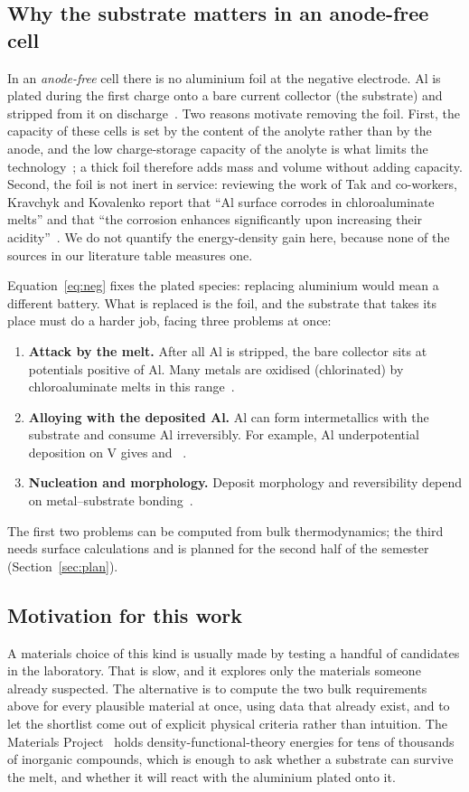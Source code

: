 \documentclass{report}
\begin{document}
\subsection{Why the substrate matters in an anode-free cell}
In an \emph{anode-free} cell there is no aluminium foil at the negative electrode. Al is plated during the first charge onto a bare current collector (the substrate) and stripped from it on discharge~\citep{WangL2021}. Two reasons motivate removing the foil. First, the capacity of these cells is set by the  content of the anolyte rather than by the anode, and the low charge-storage capacity of the anolyte is what limits the technology~\citep{Kravchyk2020}; a thick foil therefore adds mass and volume without adding capacity. Second, the foil is not inert in service: reviewing the work of Tak and co-workers, Kravchyk and Kovalenko report that ``Al surface corrodes in chloroaluminate melts'' and that ``the corrosion enhances significantly upon increasing their acidity''~\citep{Kravchyk2020b}. We do not quantify the energy-density gain here, because none of the sources in our literature table measures one.

Equation~\eqref{eq:neg} fixes the plated species: replacing aluminium would mean a different battery. What is replaced is the foil, and the substrate that takes its place must do a harder job, facing three problems at once:
\begin{enumerate}[leftmargin=*]
\item \textbf{Attack by the melt.} After all Al is stripped, the bare collector sits at potentials positive of Al. Many metals are oxidised (chlorinated) by chloroaluminate melts in this range~\citep{Wang2018,Oh2018,Reed2013}.
\item \textbf{Alloying with the deposited Al.} Al can form intermetallics with the substrate and consume Al irreversibly. For example, Al underpotential deposition on V gives  and ~\citep{Cvetkovic2021}.
\item \textbf{Nucleation and morphology.} Deposit morphology and reversibility depend on metal--substrate bonding~\citep{Zheng2021}.
\end{enumerate}
The first two problems can be computed from bulk thermodynamics; the third needs surface calculations and is planned for the second half of the semester (Section~\ref{sec:plan}).

\subsection{Motivation for this work}
A materials choice of this kind is usually made by testing a handful of candidates in the laboratory. That is slow, and it explores only the materials someone already suspected. The alternative is to compute the two bulk requirements above for every plausible material at once, using data that already exist, and to let the shortlist come out of explicit physical criteria rather than intuition. The Materials Project~\citep{Jain2013} holds density-functional-theory energies for tens of thousands of inorganic compounds, which is enough to ask whether a substrate can survive the melt, and whether it will react with the aluminium plated onto it.
\end{document}
